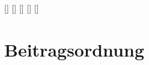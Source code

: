 
 
[]{}{}
[]{}{}
[]{}{}
[]{}{}
[]{}{}
 


\subject{Vereinsordnung}
\title{\name}
\subtitle{Vereinsordnung für den \name}
\date{\today\\v0.69}
\maketitle

\tableofcontents

\appendix

\section{Beitragsordnung}
